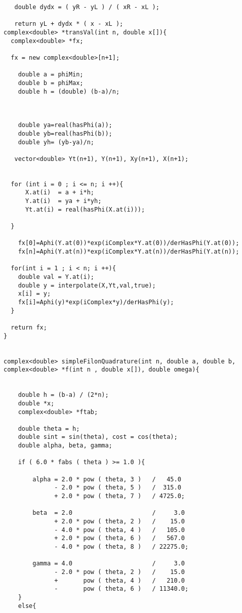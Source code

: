 \begin{lstlisting}
   double dydx = ( yR - yL ) / ( xR - xL );                                    

   return yL + dydx * ( x - xL );                                              
complex<double> *transVal(int n, double x[]){
  complex<double> *fx;
  
  fx = new complex<double>[n+1];

    double a = phiMin;
    double b = phiMax;
    double h = (double) (b-a)/n; 

   

    double ya=real(hasPhi(a));
    double yb=real(hasPhi(b));
    double yh= (yb-ya)/n;

   vector<double> Yt(n+1), Y(n+1), Xy(n+1), X(n+1);

    
  for (int i = 0 ; i <= n; i ++){
      X.at(i)  = a + i*h; 
      Y.at(i)  = ya + i*yh;
      Yt.at(i) = real(hasPhi(X.at(i)));
      
  }
     
    fx[0]=Aphi(Y.at(0))*exp(iComplex*Y.at(0))/derHasPhi(Y.at(0));
    fx[n]=Aphi(Y.at(n))*exp(iComplex*Y.at(n))/derHasPhi(Y.at(n)); 

  for(int i = 1 ; i < n; i ++){
    double val = Y.at(i); 
    double y = interpolate(X,Yt,val,true); 
    x[i] = y;
    fx[i]=Aphi(y)*exp(iComplex*y)/derHasPhi(y); 
  }

  return fx;
}


complex<double> simpleFilonQuadrature(int n, double a, double b, complex<double> *f(int n , double x[]), double omega){


    double h = (b-a) / (2*n);
    double *x;
    complex<double> *ftab;

    double theta = h;
    double sint = sin(theta), cost = cos(theta);
    double alpha, beta, gamma;
    
    if ( 6.0 * fabs ( theta ) >= 1.0 ){

        alpha = 2.0 * pow ( theta, 3 )   /   45.0 
              - 2.0 * pow ( theta, 5 )   /  315.0 
              + 2.0 * pow ( theta, 7 )   / 4725.0;
    
        beta  = 2.0                      /     3.0 
              + 2.0 * pow ( theta, 2 )   /    15.0 
              - 4.0 * pow ( theta, 4 )   /   105.0 
              + 2.0 * pow ( theta, 6 )   /   567.0 
              - 4.0 * pow ( theta, 8 )   / 22275.0;

        gamma = 4.0                      /     3.0 
              - 2.0 * pow ( theta, 2 )   /    15.0 
              +       pow ( theta, 4 )   /   210.0 
              -       pow ( theta, 6 )   / 11340.0;
    }
    else{
         

\end{lstlisting}
